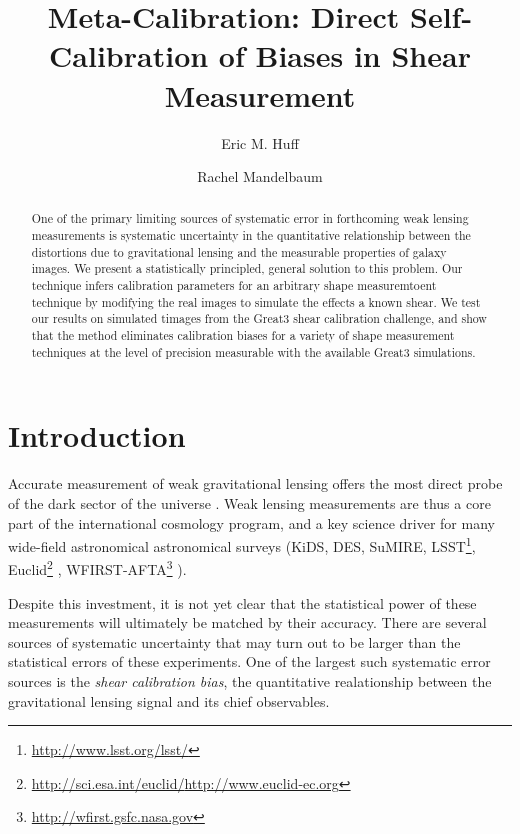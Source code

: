 \documentclass[iop]{emulateapj}
\begin{document}
\title{Meta-Calibration: Direct Self-Calibration of Biases in Shear Measurement}
\author{Eric M. Huff}
\author{Rachel Mandelbaum}



\begin{abstract}
  One of the primary limiting sources of systematic error in forthcoming
  weak lensing measurements is systematic uncertainty in the
  quantitative relationship between the distortions due to
  gravitational lensing and the measurable properties of galaxy
  images. We present a statistically principled, general solution to
  this problem. Our technique infers calibration parameters for an
  arbitrary shape measuremtoent technique by modifying the real images
  to simulate the effects a known shear. We test our results on
  simulated timages from the Great3 shear calibration challenge, and
  show that the method eliminates calibration biases for a variety of
  shape measurement techniques at the level of precision measurable
  with the available Great3 simulations.
\end{abstract}



\section{Introduction}


Accurate measurement of weak gravitational lensing offers the most
direct probe of the dark sector of the universe
\citep[e.g.,][]{2001PhR...340..291B,2003ARA&A..41..645R,schneider06,2008ARNPS..58...99H,2010RPPh...73h6901M,2013PhR...530...87W}.
Weak lensing measurements are thus a core part of the international
cosmology program, and a key science driver for many wide-field
astronomical astronomical surveys (KiDS, DES, SuMIRE,
LSST\footnote{\url{http://www.lsst.org/lsst/}},
Euclid\footnote{\url{http://sci.esa.int/euclid/}\url{http://www.euclid-ec.org}}
\citep{2011arXiv1110.3193L},
WFIRST-AFTA\footnote{\url{http://wfirst.gsfc.nasa.gov}}
\citep{2009arXiv0912.0201L,2011arXiv1110.3193L,2015arXiv150303757S}).

Despite this investment, it is not yet clear that the statistical
power of these measurements will ultimately be matched by their
accuracy. There are several sources of systematic uncertainty that may
turn out to be larger than the statistical errors of these
experiments. One of the largest such systematic error sources is the
{\it shear calibration bias}, the quantitative realationship between
the gravitational lensing signal and its chief observables.
\end{document}
